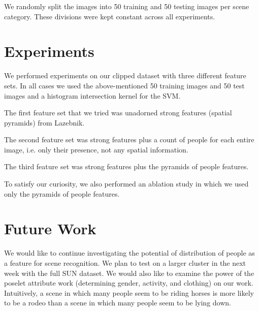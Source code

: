 \documentclass[11pt]{article}
\begin{document}
We randomly split the images into 50 training and 50 testing images per scene category.  These divisions were kept constant across all experiments.






\section{Experiments}
We performed experiments on our clipped dataset with three different feature sets.  In all cases we used the above-mentioned 50 training images and 50 test images and a histogram intersection kernel for the SVM.

The first feature set that we tried was unadorned strong features (spatial pyramids) from Lazebnik.

The second feature set was strong features plus a count of people for each entire image, i.e. only their presence, not any spatial information.

The third feature set was strong features plus the pyramids of people features.

To satisfy our curiosity, we also performed an ablation study in which we used only the pyramids of people features.

\section{Future Work}
We would like to continue investigating the potential of distribution of people as a feature for scene recognition.  We plan to test on a larger cluster in the next week with the full SUN dataset.  We would also like to examine the power of the poselet attribute work (determining gender, activity, and clothing) on our work.  Intuitively, a scene in which many people seem to be riding horses is more likely to be a rodeo than a scene in which many people seem to be lying down.



\end{document}
